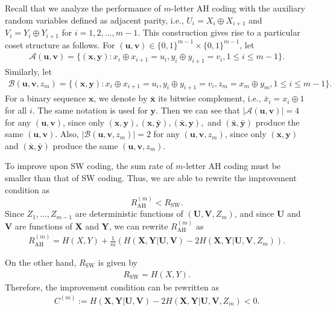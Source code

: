 \documentclass[journal,onecolumn]{IEEEtran}
\theoremstyle{definition}
\theoremstyle{remark}
\newcommand{\xm}{\bm{x}}
\newcommand{\ym}{\bm{y}}
\newcommand{\um}{\bm{u}}
\newcommand{\vm}{\bm{v}}
\newcommand{\Xm}{\bm{X}}
\newcommand{\Ym}{\bm{Y}}
\newcommand{\Um}{\bm{U}}
\newcommand{\Vm}{\bm{V}}
\begin{document}
    Recall that we analyze the performance of $m$-letter AH coding with the auxiliary random variables defined as adjacent parity, i.e., $U_i=X_i\oplus X_{i+1}$ and $V_i=Y_i\oplus Y_{i+1}$ for $i=1,2,\ldots,m-1$.
    This construction gives rise to a particular coset structure as follows.
    For $( \um , \vm )\in \{0,1\}^{m-1} \times \{0,1\}^{m-1}$, let
        \begin{align*}
            \mathcal{A}( \um , \vm ) = \{( \xm , \ym ): x_i \oplus x_{i+1} = u_i, y_i \oplus y_{i+1} = v_i, 1 \leq i \leq m-1 \}.
        \end{align*}
    Similarly, let
        \begin{align*}
            \mathcal{B}( \um , \vm ,z_m) = \{( \xm , \ym ): x_i \oplus x_{i+1} = u_i, y_i \oplus y_{i+1} = v_i, z_m = x_m \oplus y_m, 1 \leq i \leq m-1 \}.
        \end{align*}
    For a binary sequence $\xm$, we denote by $\bar{\xm}$ its bitwise complement, i.e., $\bar{x}_i=x_i\oplus 1$ for all $i$.
    The same notation is used for $\ym$.
    Then we can see that $|\mathcal{A}(\um,\vm)|=4$ for any $( \um , \vm )$, since only $( \xm , \ym ),( \xm ,\bar{ \ym }),(\bar{ \xm }, \ym ),$ and $(\bar{ \xm },\bar{ \ym })$ produce the same $( \um , \vm )$.
    Also, $|\mathcal{B}(\um,\vm,z_m)|=2$ for any $( \um , \vm ,z_m)$, since only $( \xm , \ym )$ and $(\bar{ \xm },\bar{ \ym })$ produce the same $( \um , \vm ,z_m)$.

    To improve upon SW coding, the sum rate of $m$-letter AH coding must be smaller than that of SW coding.
    Thus, we are able to rewrite the improvement condition as 
    \begin{equation*}
            R^{(m)}_{\mathrm{AH}} < R_{\mathrm{SW}}.
    \end{equation*}
    Since $Z_1,\ldots,Z_{m-1}$ are deterministic functions of $(\Um,\Vm,Z_m)$, and since $\Um$ and $\Vm$ are functions of $\Xm$ and $\Ym$, we can rewrite $R^{(m)}_{\mathrm{AH}}$ as
    \begin{align*}
        R^{(m)}_{\mathrm{AH}} = H(X,Y) + \frac{1}{m}\left( H(\Xm,\Ym|\Um,\Vm) - 2H(\Xm,\Ym|\Um,\Vm,Z_m) \right).
    \end{align*}

    On the other hand, $R_{\mathrm{SW}}$ is given by 
    \begin{align*}
        R_{\mathrm{SW}} = H(X,Y).
    \end{align*}
    Therefore, the improvement condition can be rewritten as
    \begin{align}
        C^{(m)} := H(\Xm,\Ym|\Um,\Vm) - 2H(\Xm,\Ym|\Um,\Vm,Z_m) < 0. \label{eq:C}
    \end{align}
\end{document}
